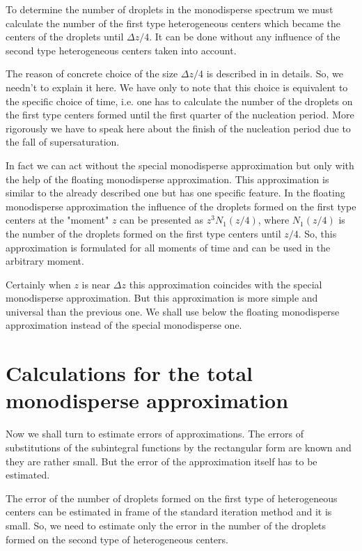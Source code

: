 To determine the number of droplets in the monodisperse spectrum we must
calculate the number of the first type heterogeneous centers which became
the centers of the droplets until $\Delta z / 4$. It can be done without
any influence of the second type heterogeneous centers taken into account.

The reason of concrete choice of the size $\Delta z / 4 $ is described
in \cite{Multidecay} in details. So, we needn't to explain it here.
We have only to note that this choice is equivalent to the  specific choice
of time, i.e. one has to calculate the number of the droplets on the first
type centers formed until the first quarter of the nucleation period. More
rigorously we have to speak here about the finish of the nucleation period
due to the fall of supersaturation.


In fact we can act without the special monodisperse approximation but
only
with the help of the floating monodisperse approximation. This approximation
is similar to the already described one but has one specific feature.
 In the floating
monodisperse approximation the influence of the droplets formed on the
first type centers at the "moment" $z$ can be presented as $z^3 N_1 (z/4)$,
where $N_1 (z/4) $
is the number of the droplets formed on the first type centers until $z/4$.
So, this approximation is formulated for all moments of time and can be
used in the arbitrary moment.

Certainly when $z$ is near $\Delta z$ this approximation coincides with
the special monodisperse approximation. But this approximation is more
simple and universal than the previous one. We shall use below the floating
monodisperse approximation instead of the special monodisperse one.

\section{Calculations for the total monodisperse approximation}

Now we shall turn to estimate errors of approximations. The errors of
substitutions of the subintegral functions by the rectangular form are
known and they are rather small. But the error of the
approximation itself has to be estimated.

The error of the number of droplets formed on the first type of heterogeneous
centers can be estimated in frame of the standard iteration method and
it is small. So, we need to estimate only the error in the number of the
droplets formed on the second type of heterogeneous centers.

